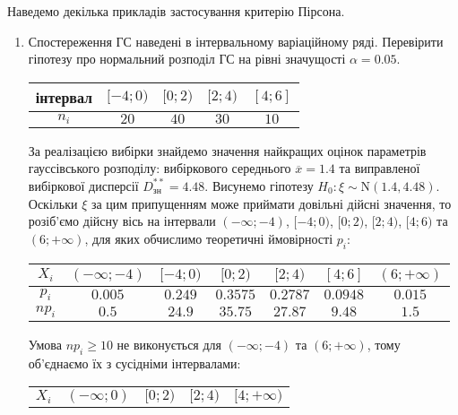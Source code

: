 Наведемо декілька прикладів застосування критерію Пірсона.
\begin{example}
    \begin{enumerate}
        \item Спостереження ГС наведені в інтервальному варіаційному ряді. Перевірити гіпотезу про нормальний розподіл ГС
        на рівні значущості $\alpha = 0.05$.
        \begin{center}
            \begin{tabular}{|c|c|c|c|c|}
                \hline
                інтервал & $[-4; 0)$ & $[0; 2)$ & $[2; 4)$ & $[4; 6]$ \\
                \hline
                $n_i$ & $20$ & $40$ & $30$ & $10$ \\
                \hline
            \end{tabular}
        \end{center}
            За реалізацією вибірки знайдемо значення найкращих 
            оцінок параметрів гауссівського розподілу: вибіркового середнього $\overline{x} = 1.4$ та виправленої вибіркової
            дисперсії $D^{**}_{\text{зн}} = 4.48$. Висунемо гіпотезу $H_0:\xi \sim \mathrm{N}(1.4, 4.48)$. Оскільки $\xi$ за цим припущенням може приймати довільні дійсні значення, то розіб'ємо
            дійсну вісь на інтервали $(-\infty; -4)$, $[-4; 0)$, $[0; 2)$, $[2; 4)$, $[4; 6)$ та $(6; +\infty)$, для яких обчислимо теоретичні ймовірності $p_i$:
            \begin{center}
                \begin{tabular}{|c|c|c|c|c|c|c|}
                    \hline
                    $X_i$ & $(-\infty; -4)$ & $[-4; 0)$ & $[0; 2)$ & $[2; 4)$ & $[4; 6]$ & $(6; +\infty)$\\
                    \hline
                    $p_i$ & $0.005$ & $0.249$ & $0.3575$ & $0.2787$ & $0.0948$ & $0.015$ \\
                    \hline
                    $n p_i$ & $0.5$ & $24.9$ & $35.75$ & $27.87$ & $9.48$ & $1.5$ \\
                    \hline
                \end{tabular}
            \end{center}
            Умова $np_i \geq 10$ не виконується для $(-\infty; -4)$ та $(6; +\infty)$, тому об'єднаємо їх з сусідніми інтервалами:
            \begin{center}
                \begin{tabular}{|c|c|c|c|c|}
                    \hline
                    $X_i$ & $(-\infty; 0)$ & $[0; 2)$ & $[2; 4)$ & $[4; +\infty)$ \\

\end{tabular}
\end{center}
\end{enumerate}
\end{example}
